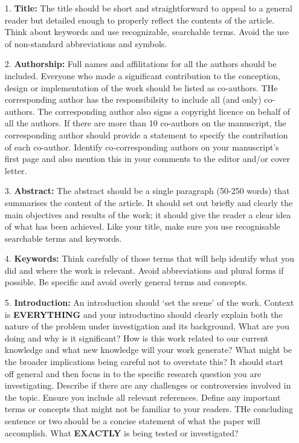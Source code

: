 \begin{itemize}
    \item[1.] \textbf{Title:} The title should be short and straightforward to appeal to a general reader but detailed enough to properly reflect the contents of the article. Think about keywords and use recognizable, searchable terms. Avoid the use of non-standard abbreviations and symbols.
    \item[2.] \textbf{Authorship:} Full names and affilitations for all the authors should be included. Everyone who made a significant contribution to the conception, design or implementation of the work should be listed as co-authors. THe corresponding author has the responsibilsity to include all (and only) co-authors. The corresponding author also signs a copyright licence on behalf of all the authors. If there are more than 10 co-authors on the manuscript, the corresponding author should provide a statement to specify the contribution of each co-author. Identify co-corresponding authors on your manuscript's first page and also mention this in your comments to the editor and/or cover letter.
    \item[3.] \textbf{Abstract:} The abstract should be a single paragraph (50-250 words) that summarises the content of the article. It should set out briefly and clearly the main objectives and results of the work; it should give the reader a clear idea of what has been achieved. Like your title, make sure you use recognisable searchable terms and keywords.
    \item[4.] \textbf{Keywords:} Think carefully of those terms that will help identify what you did and where the work is relevant. Avoid abbreviations and plural forms if possible. Be specific and avoid overly general terms and concepts.
    \item[5.] \textbf{Introduction:} An introduction should `set the scene' of the work. Context is \textbf{EVERYTHING} and your introductino should clearly explain both the nature of the problem under investigation and its background. What are you doing and why is it significant? How is this work related to our current knowledge and what new knowledge will your work generate? What might be the broader implications being careful not to overstate this? It should start off general and then focus in to the specific research question you are investigating. Describe if there are any challenges or controversies involved in the topic. Ensure you include all relevant references. Define any important terms or concepts that might not be familiar to your readers. THe concluding sentence or two should be a concise statement of what the paper will accomplish. What \textbf{EXACTLY} is being tested or investigated?

\end{itemize}
